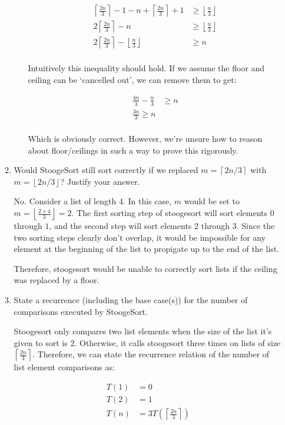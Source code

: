 \documentclass{article}
\newcommand{\ceil}[1]{\left\lceil#1\right\rceil}
\newcommand{\floor}[1]{\left\lfloor#1\right\rfloor}
\newcommand{\question}[1]{\bgroup\color{blue}#1\egroup}
\begin{document}
\begin{enumerate}
\begin{enumerate}
\begin{itemize}
  \begin{align*}
    \ceil{\frac{2n}{3}} - 1 - n + \ceil{\frac{2n}{3}} + 1 &\geq \floor{\frac{n}{3}}\\
    2\ceil{\frac{2n}{3}} - n &\geq \floor{\frac{n}{3}}\\
    2\ceil{\frac{2n}{3}} - \floor{\frac{n}{3}} &\geq n\\
  \end{align*}

  Intuitively this inequality should hold. If we assume the floor and ceiling can be `cancelled out', we can remove them to get:

  \begin{align*}
    \frac{4n}{3} - \frac{n}{3} &\geq n\\
    \frac{3n}{3} \geq n\\
  \end{align*}

  Which is obviously correct. However, we're unsure how to reason about floor/ceilings in such a way to prove this rigorously.

  \end{itemize}

    \item
      \question{Would StoogeSort still sort correctly if we replaced $m = \ceil{2n/3}$ with $m = \floor{2n/3}$? Justify
      your answer.}

No. Consider a list of length 4. In this case, $m$ would be set to $m = \floor{\frac{2 \times 4}{3}} = 2$. 
The first sorting step of stoogesort will sort elements $0$ through $1$, and the second step will sort elements $2$ through $3$.
Since the two sorting steps clearly don't overlap, it would be impossible for any element at the beginning of the list to propigate up to the end of the list.

Therefore, stoogesort would be unable to correctly sort lists if the ceiling was replaced by a floor.

 
    \item
      \question{State a recurrence (including the base case(s)) for the number of comparisons executed by
      StoogeSort.}

Stoogesort only compares two list elements when the size of the list it's given to sort is 2. Otherwise, it calls stoogesort three times on lists of size $\ceil{\frac{2n}{3}}$. Therefore, we can state the recurrence relation of the number of list element comparisons as:

\begin{align*}
T(1) &= 0\\
T(2) &= 1\\
T(n) &= 3T(\ceil{\frac{2n}{3}})
\end{align*}


\end{enumerate}
\end{enumerate}
\end{document}

